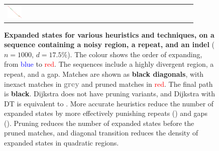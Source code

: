 \begin{figure}[t]
\begin{tabular}{l>{\centering}m{0.18\linewidth}>{\centering}m{0.18\linewidth}>{\centering}m{0.18\linewidth}>{\centering\arraybackslash}m{0.35\linewidth}}
    \includegraphics[scale=0.15]{imgs/comparison/gcsh-dt.png} \\
  \end{tabular}
  \caption[Expanded states for various algorithms complex
      examples]{\textbf{Expanded states for various heuristics and techniques,
      on a sequence containing a noisy region, a repeat, and an indel}
      ($n{=}1000$, $d{=}17.5\%$). The colour shows the order of expanding, from
      \textcolor{blue}{blue} to \textcolor{red}{red}. The sequences include a
      highly divergent region, a repeat, and a gap. Matches are shown as
      \textbf{black diagonals}, with inexact matches in
      \textbf{\textcolor{gray}{grey}} and pruned matches in
      \textcolor{red}{red}. The final path is \textbf{black}. Dijkstra does not
      have pruning variants, and Dijkstra with DT is equivalent to \oldwfa. More
      accurate heuristics reduce the number of expanded states by more
      effectively punishing repeats (\CSH) and gaps (\GCH). Pruning reduces the
      number of expanded states before the pruned matches, and diagonal
      transition reduces the density of expanded states in quadratic regions.}
  \label{fig:comparison}
\end{figure}

